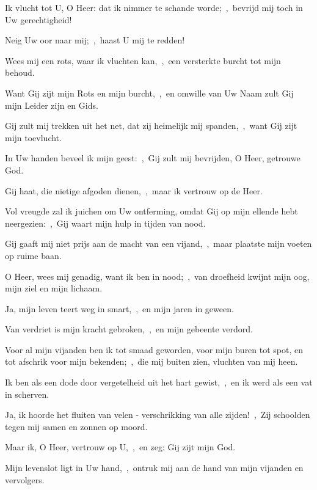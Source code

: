 \documentclass[12pt,twoside,a5paper]{article}
\begin{document}

\begin{halfparskip}
   Ik vlucht tot U, O Heer: dat ik nimmer te schande worde;~\sep\ bevrijd mij toch in Uw gerechtigheid!


  Neig Uw oor naar mij;~\sep\ haast U mij te redden!

  Wees mij een rots, waar ik vluchten kan,~\sep\ een versterkte burcht tot mijn behoud.

  Want Gij zijt mijn Rots en mijn burcht,~\sep\ en omwille van Uw Naam zult Gij mijn Leider zijn en Gids.

  Gij zult mij trekken uit het net, dat zij heimelijk mij spanden,~\sep\ want Gij zijt mijn toevlucht.

  In Uw handen beveel ik mijn geest:~\sep\ Gij zult mij bevrijden, O Heer, getrouwe God.

  Gij haat, die nietige afgoden dienen,~\sep\ maar ik vertrouw op de Heer.

  Vol vreugde zal ik juichen om Uw ontferming, omdat Gij op mijn ellende hebt neergezien:~\sep\ Gij waart mijn hulp in tijden van nood.

  Gij gaaft mij niet prijs aan de macht van een vijand,~\sep\ maar plaatste mijn voeten op ruime baan.

  O Heer, wees mij genadig, want ik ben in nood;~\sep\ van droefheid kwijnt mijn oog, mijn ziel en mijn lichaam.

  Ja, mijn leven teert weg in smart,~\sep\ en mijn jaren in geween.

  Van verdriet is mijn kracht gebroken,~\sep\ en mijn gebeente verdord.

  Voor al mijn vijanden ben ik tot smaad geworden, voor mijn buren tot spot, en tot afschrik voor mijn bekenden;~\sep\ die mij buiten zien, vluchten van mij heen.

  Ik ben als een dode door vergetelheid uit het hart gewist,~\sep\ en ik werd als een vat in scherven.

  Ja, ik hoorde het fluiten van velen - verschrikking van alle zijden!~\sep\ Zij schoolden tegen mij samen en zonnen op moord.

  Maar ik, O Heer, vertrouw op U,~\sep\ en zeg: Gij zijt mijn God.

  Mijn levenslot ligt in Uw hand,~\sep\ ontruk mij aan de hand van mijn vijanden en vervolgers.


\end{halfparskip}
\end{document}
